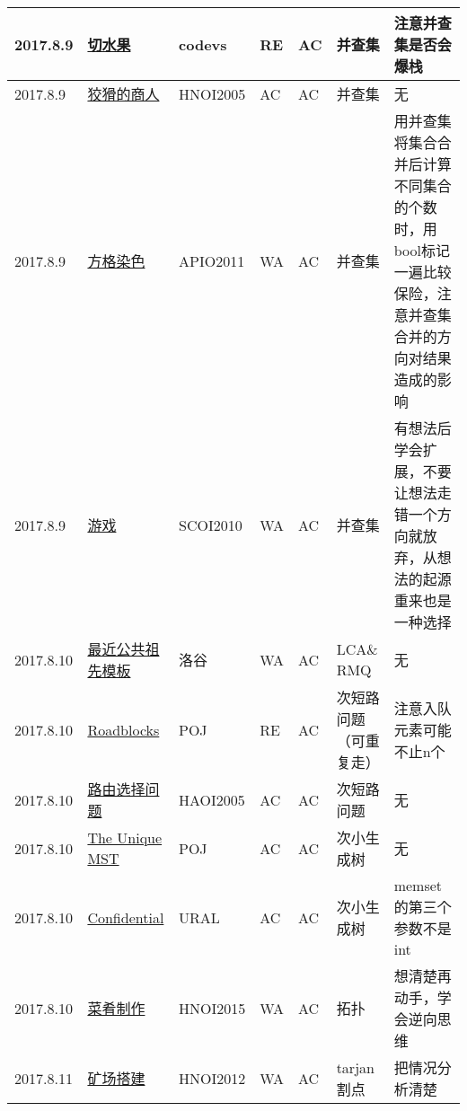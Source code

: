 \documentclass[a4paper]{article}
\begin{document}
\begin{longtable}{|p{1.5cm}|p{2.5cm}|p{1.6cm}|p{1.6cm}|p{1cm}|p{3cm}|p{4cm}|}
		\hline
		2017.8.9 & \href {http://codevs.cn/problem/1299/}{切水果}
		 & codevs & RE & AC & 并查集 & 注意并查集是否会爆栈\\
		
		\hline
		2017.8.9 & \href {http://www.lydsy.com/JudgeOnline/problem.php?id=1202}{狡猾的商人}
		 & HNOI2005 & AC & AC & 并查集 & 无\\
		
		\hline
		2017.8.9 & \href {http://www.lydsy.com/JudgeOnline/problem.php?id=2303}{方格染色}
		 & APIO2011 & WA & AC & 并查集 & 用并查集将集合合并后计算不同集合的个数时，用bool标记一遍比较保险，注意并查集合并的方向对结果造成的影响\\
		
		\hline
		2017.8.9 & \href {http://www.lydsy.com/JudgeOnline/problem.php?id=1854}{游戏}
		 & SCOI2010 & WA & AC & 并查集 & 有想法后学会扩展，不要让想法走错一个方向就放弃，从想法的起源重来也是一种选择\\
		
		\hline
		2017.8.10 & \href {https://www.luogu.org/problem/show?pid=3379#sub}{最近公共祖先模板}
		 & 洛谷 & WA & AC & LCA\& RMQ & 无\\
		
		\hline
		2017.8.10 & \href {https://vjudge.net/problem/POJ-3255}{Roadblocks}
		 & POJ & RE & AC & 次短路问题（可重复走） & 注意入队元素可能不止n个\\
		
		\hline
		2017.8.10 & \href {http://www.cogs.pro/cogs/problem/problem.php?pid=22}{路由选择问题}
		 & HAOI2005 & AC & AC & 次短路问题 & 无\\
		
		\hline
		2017.8.10 & \href {https://vjudge.net/problem/POJ-1679}{The Unique MST}
		 & POJ & AC & AC & 次小生成树 & 无\\
		
		\hline
		2017.8.10 & \href {https://vjudge.net/problem/URAL-1416}{Confidential}
		 & URAL & AC & AC & 次小生成树 & memset的第三个参数不是int\\
		
		\hline
		2017.8.10 & \href {http://www.lydsy.com/JudgeOnline/problem.php?id=4010}{菜肴制作}
		 & HNOI2015 & WA & AC & 拓扑 & 想清楚再动手，学会逆向思维\\
		
		\hline
		2017.8.11 & \href {http://www.lydsy.com/JudgeOnline/problem.php?id=2730}{矿场搭建}
		 & HNOI2012 & WA & AC & tarjan割点 & 把情况分析清楚\\
		

\end{longtable}
\end{document}
